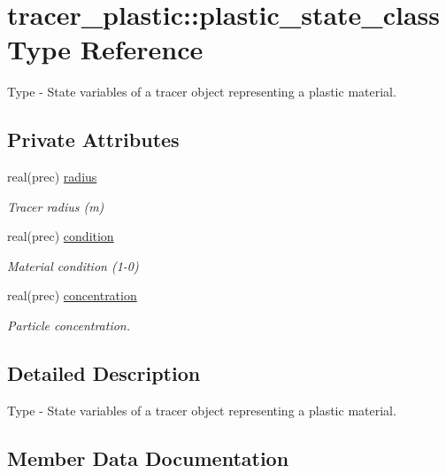 \hypertarget{structtracer__plastic_1_1plastic__state__class}{}\section{tracer\+\_\+plastic\+:\+:plastic\+\_\+state\+\_\+class Type Reference}
\label{structtracer__plastic_1_1plastic__state__class}


Type -\/ State variables of a tracer object representing a plastic material.  


\subsection*{Private Attributes}
\begin{DoxyCompactItemize}
\item 
real(prec) \hyperlink{structtracer__plastic_1_1plastic__state__class_a88e8fcff3faa943e9134fd3b43264d38}{radius}
\begin{DoxyCompactList}\small\item\em Tracer radius (m) \end{DoxyCompactList}\item 
real(prec) \hyperlink{structtracer__plastic_1_1plastic__state__class_a6420065359daf0885201b79212f13b5f}{condition}
\begin{DoxyCompactList}\small\item\em Material condition (1-\/0) \end{DoxyCompactList}\item 
real(prec) \hyperlink{structtracer__plastic_1_1plastic__state__class_a132bc977b49dc7bd320ca843bca6eab1}{concentration}
\begin{DoxyCompactList}\small\item\em Particle concentration. \end{DoxyCompactList}\end{DoxyCompactItemize}


\subsection{Detailed Description}
Type -\/ State variables of a tracer object representing a plastic material. 

\subsection{Member Data Documentation}
\mbox{\label{structtracer__plastic_1_1plastic__state__class_a132bc977b49dc7bd320ca843bca6eab1}} 
